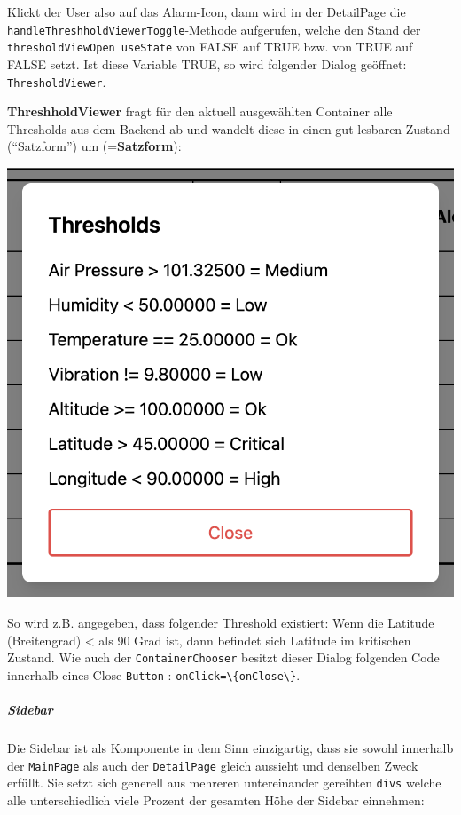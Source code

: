 \documentclass[
    headings=optiontotocandhead,%
    twoside,
    numbers=noenddot,%
    12pt, %
    titlepage, %
    parskip=full, %
    listof=leveldown, 
    numbers=noenddot, %
    a4paper,DIV=14,
    BCOR=15mm,
]{scrbook}
\newcommand{\passthrough}[1]{#1}
\let\origfigure=\figure
\let\endorigfigure=\endfigure
\renewenvironment{figure}[1][]{%
   \origfigure[H]
}{%
   \endorigfigure
}
\begin{document}
Klickt der User also auf das Alarm-Icon, dann wird in der DetailPage die
\passthrough{\lstinline!handleThreshholdViewerToggle!}-Methode
aufgerufen, welche den Stand der
\passthrough{\lstinline!thresholdViewOpen useState!} von FALSE auf TRUE
bzw. von TRUE auf FALSE setzt. Ist diese Variable TRUE, so wird
folgender Dialog geöffnet: \passthrough{\lstinline!ThresholdViewer!}.

\textbf{ThreshholdViewer} fragt für den aktuell ausgewählten Container
alle Thresholds aus dem Backend ab und wandelt diese in einen gut
lesbaren Zustand (``Satzform'') um (=\textbf{Satzform}):

\begin{figure}
\centering
\includegraphics{img/Gekle/ThreshholdViewer.png}
\caption{Threshhold Viewer Dialog}
\end{figure}

So wird z.B. angegeben, dass folgender Threshold existiert: Wenn die
Latitude (Breitengrad) \textless{} als 90 Grad ist, dann befindet sich
Latitude im kritischen Zustand. Wie auch der
\passthrough{\lstinline!ContainerChooser!} besitzt dieser Dialog
folgenden Code innerhalb eines Close \passthrough{\lstinline!Button!} :
\passthrough{\lstinline!onClick=\{onClose\}!}.

\hypertarget{sidebar}{%
\subparagraph{Sidebar}\label{sidebar}}

Die Sidebar ist als Komponente in dem Sinn einzigartig, dass sie sowohl
innerhalb der \passthrough{\lstinline!MainPage!} als auch der
\passthrough{\lstinline!DetailPage!} gleich aussieht und denselben Zweck
erfüllt. Sie setzt sich generell aus mehreren untereinander gereihten
\passthrough{\lstinline!divs!} welche alle unterschiedlich viele Prozent
der gesamten Höhe der Sidebar einnehmen:
\end{document}
